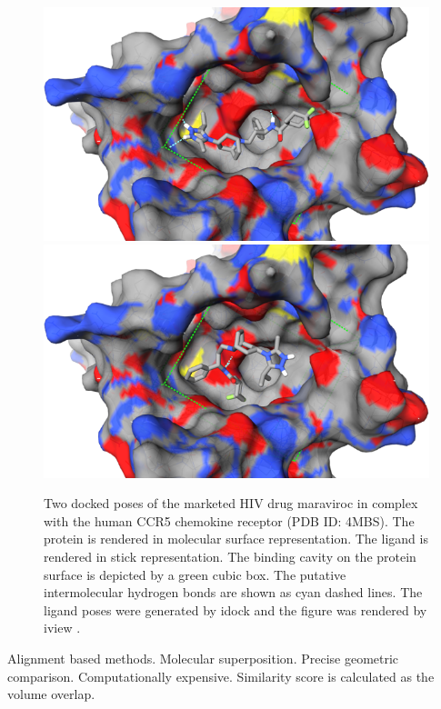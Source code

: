 \documentclass[twocolumn]{svjour3}          %
\begin{document}
\begin{figure}
\centering
\includegraphics[width=1.36\textwidth,natwidth=638,natheight=386]{../usrt/MRV0.png}
\endminipage
{}
\centering
\includegraphics[width=1.36\textwidth,natwidth=638,natheight=386]{../usrt/MRV1.png}
\endminipage
\caption{Two docked poses of the marketed HIV drug maraviroc in complex with the human CCR5 chemokine receptor (PDB ID: 4MBS). The protein is rendered in molecular surface representation. The ligand is rendered in stick representation. The binding cavity on the protein surface is depicted by a green cubic box. The putative intermolecular hydrogen bonds are shown as cyan dashed lines. The ligand poses were generated by idock \cite{1153} and the figure was rendered by iview \cite{1366}.}
\label{fig:MRV}
\end{figure}

Alignment based methods. Molecular superposition. Precise geometric comparison. Computationally expensive. Similarity score is calculated as the volume overlap.
\end{document}
